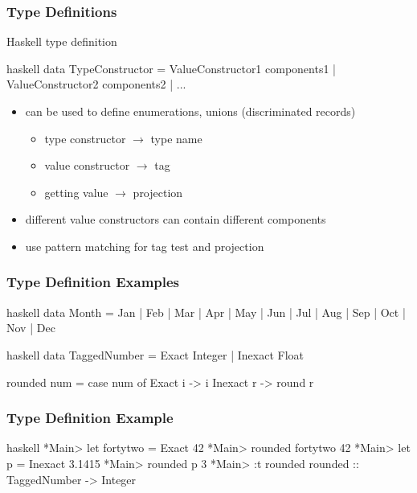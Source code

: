 \documentclass[dvipsnames]{beamer}
\theoremstyle{plain}
\begin{document}
\begin{frame}[fragile]
  \frametitle{Type Definitions}

  \begin{block}{Haskell type definition}
    \begin{pygments}{haskell}
data TypeConstructor = ValueConstructor1 components1
                     | ValueConstructor2 components2
                     | ...
    \end{pygments}
  \end{block}

  \pause
  \begin{itemize}
    \item can be used to define enumerations, unions (discriminated records)
    \begin{itemize}
      \item type constructor $\rightarrow$ type name
      \item value constructor $\rightarrow$ tag
      \item getting value $\rightarrow$ projection
    \end{itemize}
    \item different value constructors can contain different components
    \item use pattern matching for tag test and projection
  \end{itemize}
\end{frame}

\begin{frame}[fragile]
  \frametitle{Type Definition Examples}

  \begin{example}
    \begin{pygments}{haskell}
data Month = Jan | Feb | Mar | Apr | May | Jun
           | Jul | Aug | Sep | Oct | Nov | Dec
    \end{pygments}

    \pause
    \bigskip
    \bigskip
    \begin{pygments}{haskell}
data TaggedNumber = Exact Integer | Inexact Float

rounded num =
    case num of
      Exact i -> i
      Inexact r -> round r
    \end{pygments}
  \end{example}
\end{frame}

\begin{frame}[fragile]
  \frametitle{Type Definition Example}

  \begin{example}
    \begin{pygments}{haskell}
*Main> let fortytwo = Exact 42
*Main> rounded fortytwo
42
*Main> let p = Inexact 3.1415
*Main> rounded p
3
*Main> :t rounded
rounded :: TaggedNumber -> Integer
    \end{pygments}
  \end{example}
\end{frame}
\end{document}
